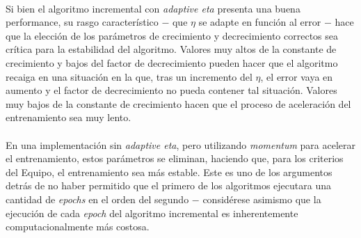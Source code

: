 \documentclass[12pt, twocolumn]{article}
\begin{document}
	\paragraph{} Si bien el algoritmo incremental con \textit{adaptive eta} presenta una buena performance, su rasgo característico $-$ que $\eta$ se adapte en función al error $-$ hace que la elección de los parámetros de crecimiento y decrecimiento correctos sea crítica para la estabilidad del algoritmo. Valores muy altos de la constante de crecimiento y bajos del factor de decrecimiento pueden hacer que el algoritmo recaiga en una situación en la que, tras un incremento del $\eta$, el error vaya en aumento y el factor de decrecimiento no pueda contener tal situación. Valores muy bajos de la constante de crecimiento hacen que el proceso de aceleración del entrenamiento sea muy lento. 
	
	\paragraph{} En una implementación sin \textit{adaptive eta}, pero utilizando \textit{momentum} para acelerar el entrenamiento, estos parámetros se eliminan, haciendo que, para los criterios del Equipo, el entrenamiento sea más estable. Este es uno de los argumentos detrás de no haber permitido que el primero de los algoritmos ejecutara una cantidad de \textit{epochs} en el orden del segundo $-$ considérese asimismo que la ejecución de cada \textit{epoch} del algoritmo incremental es inherentemente computacionalmente más costosa. 
	
	
	
	
	
	
	
	
	
	
\end{document}

